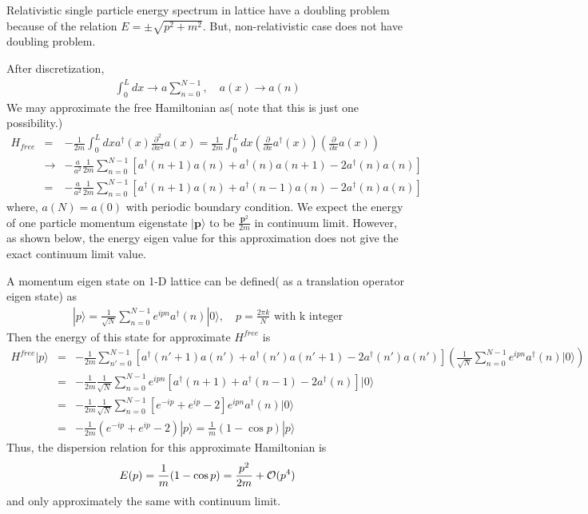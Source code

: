 \documentclass[10pt]{book}
\def\bm{\boldsymbol}
\newcommand{\bea}{\begin{eqnarray}}
\newcommand{\eea}{\end{eqnarray}}
\newcommand{\no}{\nonumber \\}
\newcommand{\del}{\partial}
\def\vp{{\bm p}}
\def\ra{\rangle}
\begin{document}
Relativistic single particle energy spectrum in lattice have a doubling problem because of
the relation $E=\pm\sqrt{p^2+m^2}$.  But, non-relativistic case does not have doubling problem. 

After discretization, 
\bea 
\int_0^L dx\to a \sum_{n=0}^{N-1},\quad a(x)\to a(n) 
\eea 
We may approximate the free Hamiltonian as( note that this is just one possibility.)
\bea
H_{free}&=&-\frac{1}{2m}\int_0^L dx a^\dagger(x)\frac{\del^2}{\del x^2} a(x)
          =\frac{1}{2m}\int_0^L dx (\frac{\del}{\del x} a^\dagger(x))(\frac{\del}{\del x} a(x) )\no 
        &\to& -\frac{a}{a^2}\frac{1}{2m}\sum_{n=0}^{N-1}[ a^\dagger(n+1) a(n)+  a^\dagger(n) a(n+1)
                                            -2 a^\dagger(n)a(n)]\no 
        &=&-\frac{a}{a^2}\frac{1}{2m}\sum_{n=0}^{N-1}[ a^\dagger(n+1) a(n)+  a^\dagger(n-1) a(n)
                      -2 a^\dagger(n)a(n)]                                     
\eea
where, $a(N)=a(0)$ with periodic boundary condition.
We expect the energy of one particle momentum eigenstate $|\vp\ra$ to be $\frac{\vp^2}{2m}$
in continuum limit. However, as shown below, the energy eigen value for this approximation 
does not give the exact continuum limit value.

A momentum eigen state on 1-D lattice can be defined( as a translation operator eigen state) as
\bea 
|p\ra =\frac{1}{\sqrt{N}}\sum_{n=0}^{N-1} e^{ipn} a^\dagger(n)|0\ra ,
 \quad p=\frac{2\pi k}{N} \mbox{ with k integer}
\eea 
Then the energy of this state for approximate $H^{free}$ is 
\bea 
H^{free}|p\ra&=&-\frac{1}{2m}\sum_{n'=0}^{N-1}[ a^\dagger(n'+1) a(n')+a^\dagger(n') a(n'+1) -2a^\dagger(n') a(n') ] 
\left( \frac{1}{\sqrt{N}}\sum_{n=0}^{N-1} e^{ipn}a^\dagger(n)|0\ra \right) \no 
&=&-\frac{1}{2m}\frac{1}{\sqrt{N}}\sum_{n=0}^{N-1} e^{ipn}
[ a^\dagger(n+1)+a^\dagger(n-1)-2a^\dagger(n)]|0\ra  \no 
&=&-\frac{1}{2m}\frac{1}{\sqrt{N}}\sum_{n=0}^{N-1} 
[ e^{-ip}+e^{ip}-2]e^{ipn} a^\dagger(n)|0\ra \no 
&=& -\frac{1}{2m} (e^{-ip}+e^{ip}-2) |p\ra =\frac{1}{m}(1-\cos p)|p\ra   
\eea 
Thus, the dispersion relation for this approximate Hamiltonian is 
\bea 
 E(p)=\frac{1}{m}(1-\cos p)=\frac{p^2}{2m}+{\cal O}(p^4)
\eea 
and only approximately the same with continuum limit. 
\end{document}
